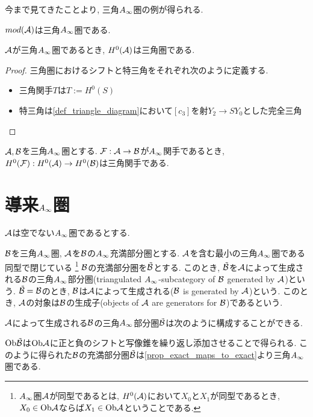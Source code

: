 \documentclass[uplatex, a4paper, 14Q, dvipdfmx]{jsarticle}
\begin{document}
今まで見てきたことより, 三角$A_{\infty}$圏の例が得られる. 

\begin{example} \label{eg_modA_is_triangulated}
  $mod (\mathcal{A})$は三角$A_{\infty}$圏である.
\end{example}

\begin{theorem}
  $\mathcal{A}$が三角$A_{\infty}$圏であるとき, $H^0(\mathcal{A})$は三角圏である. 
\end{theorem}

\begin{proof}
  三角圏におけるシフトと特三角をそれぞれ次のように定義する.
  \begin{itemize}
    \item 三角関手$T$は$T := H^0(S)$
    \item 特三角は\cref{def_triangle_diagram}において$[c_3]$を射$Y_2 \to SY_0$とした完全三角
  \end{itemize}
\end{proof}

\begin{theorem}
  $\mathcal{A},\mathcal{B}$を三角$A_{\infty}$圏とする. 
  $\mathcal{F} : \mathcal{A} \to \mathcal{B}$が$A_{\infty}$関手であるとき, $H^0(\mathcal{F}) : H^0(\mathcal{A}) \to H^0(\mathcal{B})$は三角関手である. 
\end{theorem}

\section{導来\texorpdfstring{$A_{\infty}$}{Ainf}圏}

$\mathcal{A}$は空でない$A_{\infty}$圏であるとする. 

\begin{definition}[生成子]
  $\mathcal{B}$を三角$A_{\infty}$圏, $\mathcal{A}$を$\mathcal{B}$の$A_{\infty}$充満部分圏とする. 
  $\mathcal{A}$を含む最小の三角$A_{\infty}$圏である同型で閉じている
  \footnote{
    $A_{\infty}$圏$\mathcal{A}$が同型であるとは, $H^0(\mathcal{A})$において$X_0$と$X_1$が同型であるとき, $X_0 \in \mathrm{Ob}\mathcal{A}$ならば$X_1 \in \mathrm{Ob}\mathcal{A}$ということである. 
  }
  $\mathcal{B}$の充満部分圏を$\tilde{\mathcal{B}}$とする. 
  このとき, $\tilde{\mathcal{B}}$を$\mathcal{A}$によって生成される$\mathcal{B}$の三角$A_{\infty}$部分圏(triangulated $A_{\infty}$-subcategory of $\mathcal{B}$ generated by $\mathcal{A}$)という. 
  $\tilde{\mathcal{B}} = \mathcal{B}$のとき, $\mathcal{B}$は$\mathcal{A}$によって生成される($\mathcal{B}$ is generated by $\mathcal{A}$)という.
  このとき, $\mathcal{A}$の対象は$\mathcal{B}$の生成子(objects of $\mathcal{A}$ are generators for $\mathcal{B}$)であるという. 
\end{definition}

$\mathcal{A}$によって生成される$\mathcal{B}$の三角$A_{\infty}$部分圏$\tilde{\mathcal{B}}$は次のように構成することができる. 

\begin{remark}
  $\mathrm{Ob}\tilde{\mathcal{B}}$は$\mathrm{Ob}\mathcal{A}$に正と負のシフトと写像錐を繰り返し添加させることで得られる. 
  このように得られた$\mathcal{B}$の充満部分圏$\tilde{\mathcal{B}}$は\cref{prop_exact_maps_to_exact}より三角$A_{\infty}$圏である. %
\end{remark}
\end{document}
